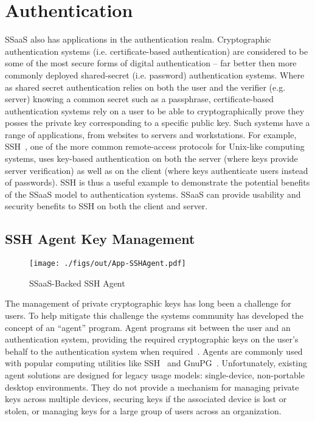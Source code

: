 \section{Authentication}

SSaaS also has applications in the authentication realm. Cryptographic
authentication systems (i.e. certificate-based authentication) are
considered to be some of the most secure forms of digital
authentication -- far better then more commonly deployed shared-secret
(i.e. password) authentication systems. Where as shared secret
authentication relies on both the user and the verifier (e.g. server)
knowing a common secret such as a passphrase, certificate-based
authentication systems rely on a user to be able to cryptographically
prove they posses the private key corresponding to a specific public
key. Such systems have a range of applications, from websites to
servers and workstations. For example, SSH~\cite{ylonen1996}, one of
the more common remote-access protocols for Unix-like computing
systems, uses key-based authentication on both the server (where keys
provide server verification) as well as on the client (where keys
authenticate users instead of passwords). SSH is thus a useful example
to demonstrate the potential benefits of the SSaaS model to
authentication systems. SSaaS can provide usability and security
benefits to SSH on both the client and server.

\subsection{SSH Agent Key Management}

\begin{figure}[t]
  \centering
  \texttt{[image: ./figs/out/App-SSHAgent.pdf]}
  \caption{SSaaS-Backed SSH Agent}
  \label{fig:app-sshagent}
\end{figure}

The management of private cryptographic keys has long been a challenge
for users. To help mitigate this challenge the systems community has
developed the concept of an ``agent'' program. Agent programs sit
between the user and an authentication system, providing the required
cryptographic keys on the user's behalf to the authentication system
when required~\cite{cox2002}. Agents are commonly used with popular
computing utilities like SSH~\cite{ylonen1996} and
GnuPG~\cite{gnupg}. Unfortunately, existing agent solutions are
designed for legacy usage models: single-device, non-portable desktop
environments. They do not provide a mechanism for managing private
keys across multiple devices, securing keys if the associated device
is lost or stolen, or managing keys for a large group of users across
an organization.

